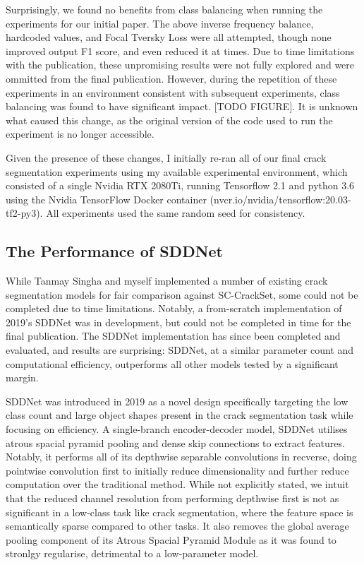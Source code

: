 \documentclass[a4paper,12pt]{report}
\begin{document}
Surprisingly, we found no benefits from class balancing when running the experiments for our initial paper. The above inverse frequency balance, hardcoded values, and Focal Tversky Loss were all attempted, though none improved output F1 score, and even reduced it at times. Due to time limitations with the publication, these unpromising results were not fully explored and were ommitted from the final publication. However, during the repetition of these experiments in an environment consistent with subsequent experiments, class balancing was found to have significant impact. [TODO FIGURE]. It is unknown what caused this change, as the original version of the code used to run the experiment is no longer accessible.

Given the presence of these changes, I initially re-ran all of our final crack segmentation experiments using my available experimental environment, which consisted of a single Nvidia RTX 2080Ti, running Tensorflow 2.1 and python 3.6 using the Nvidia TensorFlow Docker container (nvcr.io/nvidia/tensorflow:20.03-tf2-py3). All experiments used the same random seed for consistency.

\subsection{The Performance of SDDNet}
While Tanmay Singha and myself implemented a number of existing crack segmentation models for fair comparison against SC-CrackSet, some could not be completed due to time limitations. Notably, a from-scratch implementation of 2019's SDDNet \cite{choi_sddnet_2019} was in development, but could not be completed in time for the final publication. The SDDNet implementation has since been completed and evaluated, and results are surprising: SDDNet, at a similar parameter count and computational efficiency, outperforms all other models tested by a significant margin.

SDDNet was introduced in 2019 as a novel design specifically targeting the low class count and large object shapes present in the crack segmentation task while focusing on efficiency. A single-branch encoder-decoder model, SDDNet utilises atrous spacial pyramid pooling and dense skip connections to extract features. Notably, it performs all of its depthwise separable convolutions in recverse, doing pointwise convolution first to initially reduce dimensionality and further reduce computation over the traditional method. While not explicitly stated, we intuit that the reduced channel resolution from performing depthwise first is not as significant in a low-class task like crack segmentation, where the feature space is semantically sparse compared to other tasks. It also removes the global average pooling component of its Atrous Spacial Pyramid Module as it was found to stronlgy regularise, detrimental to a low-parameter model.
\end{document}
